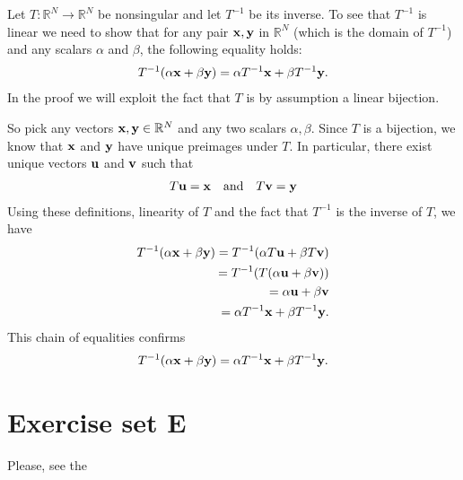 \documentclass[letterpaper,10pt,english]{jupyterBook}
\begin{document}
\sphinxAtStartPar
{}

\sphinxAtStartPar
Let \(T \colon \mathbb{R}^N \to \mathbb{R}^N\) be nonsingular and let \(T^{-1}\)
be its inverse. To see that \(T^{-1}\) is linear we need to show that for any
pair \({\bf x}, {\bf y}\) in \(\mathbb{R}^N\) (which is the domain of \(T^{-1}\)) and any
scalars \(\alpha\) and \(\beta\), the following equality holds:
\begin{equation*}
\begin{split}
T^{-1}(\alpha {\bf x} + \beta {\bf y}) = \alpha T^{-1}{\bf x} + \beta T^{-1} {\bf y}.
\end{split}
\end{equation*}
\sphinxAtStartPar
In the proof we will exploit the fact that \(T\) is by assumption a linear
bijection.

\sphinxAtStartPar
So pick any vectors \({\bf x}, {\bf y} \in \mathbb{R}^N\) and any two scalars \(\alpha,
\beta\). Since \(T\) is a bijection, we know that \({\bf x}\) and \({\bf y}\) have
unique preimages under \(T\). In particular, there exist unique vectors
\({\bf u}\) and \({\bf v}\) such that
\begin{equation*}
\begin{split}
%
T{\bf u} = {\bf x} 
\quad \text{and} \quad
T{\bf v} = {\bf y} 
%
\end{split}
\end{equation*}
\sphinxAtStartPar
Using these definitions, linearity of \(T\) and the fact that \(T^{-1}\) is the
inverse of \(T\), we have
\begin{equation*}
\begin{split}
%
T^{-1}(\alpha {\bf x} + \beta {\bf y})
= T^{-1}(\alpha T{\bf u} + \beta T {\bf v}) \\
= T^{-1}(T(\alpha {\bf u} + \beta {\bf v})) \\
= \alpha {\bf u} + \beta {\bf v} \\
= \alpha T^{-1} {\bf x} + \beta T^{-1} {\bf y}.
%
\end{split}
\end{equation*}
\sphinxAtStartPar
This chain of equalities confirms
\begin{equation*}
\begin{split}
T^{-1}(\alpha {\bf x} + \beta {\bf y}) = \alpha T^{-1}{\bf x} + \beta T^{-1} {\bf y}.
\end{split}
\end{equation*}
\sphinxstepscope


\chapter{Exercise set E}
\label{\detokenize{06.exercises.E:exercise-set-e}}\label{\detokenize{06.exercises.E::doc}}
\sphinxAtStartPar
Please, see the
{\hyperref[\detokenize{02.exercises.A::doc}]{}}
\end{document}
